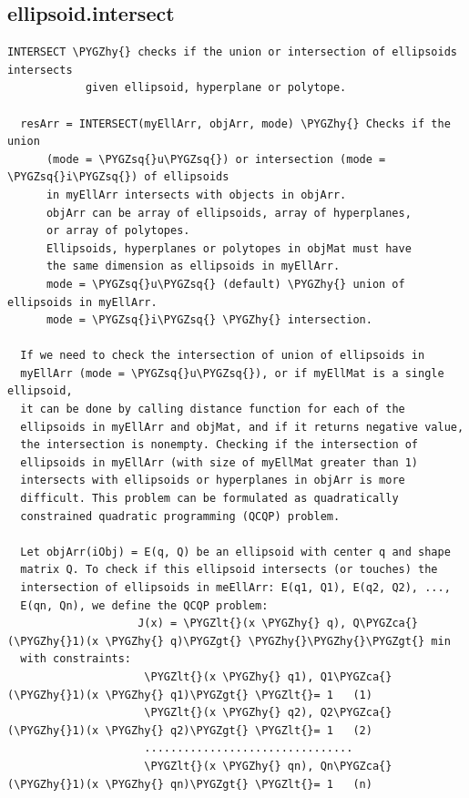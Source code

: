 \documentclass[letterpaper,10pt,english]{sphinxmanual}
\def\PYGZca{\char`\^}
\def\PYGZlt{\char`\<}
\def\PYGZgt{\char`\>}
\def\PYGZhy{\char`\-}
\def\PYGZsq{\char`\'}
\begin{document}
\subsection{ellipsoid.intersect}
\label{chap_functions:ellipsoid-intersect}
\begin{Verbatim}[commandchars=\\\{\}]
INTERSECT \PYGZhy{} checks if the union or intersection of ellipsoids intersects
            given ellipsoid, hyperplane or polytope.

  resArr = INTERSECT(myEllArr, objArr, mode) \PYGZhy{} Checks if the union
      (mode = \PYGZsq{}u\PYGZsq{}) or intersection (mode = \PYGZsq{}i\PYGZsq{}) of ellipsoids
      in myEllArr intersects with objects in objArr.
      objArr can be array of ellipsoids, array of hyperplanes,
      or array of polytopes.
      Ellipsoids, hyperplanes or polytopes in objMat must have
      the same dimension as ellipsoids in myEllArr.
      mode = \PYGZsq{}u\PYGZsq{} (default) \PYGZhy{} union of ellipsoids in myEllArr.
      mode = \PYGZsq{}i\PYGZsq{} \PYGZhy{} intersection.

  If we need to check the intersection of union of ellipsoids in
  myEllArr (mode = \PYGZsq{}u\PYGZsq{}), or if myEllMat is a single ellipsoid,
  it can be done by calling distance function for each of the
  ellipsoids in myEllArr and objMat, and if it returns negative value,
  the intersection is nonempty. Checking if the intersection of
  ellipsoids in myEllArr (with size of myEllMat greater than 1)
  intersects with ellipsoids or hyperplanes in objArr is more
  difficult. This problem can be formulated as quadratically
  constrained quadratic programming (QCQP) problem.

  Let objArr(iObj) = E(q, Q) be an ellipsoid with center q and shape
  matrix Q. To check if this ellipsoid intersects (or touches) the
  intersection of ellipsoids in meEllArr: E(q1, Q1), E(q2, Q2), ...,
  E(qn, Qn), we define the QCQP problem:
                    J(x) = \PYGZlt{}(x \PYGZhy{} q), Q\PYGZca{}(\PYGZhy{}1)(x \PYGZhy{} q)\PYGZgt{} \PYGZhy{}\PYGZhy{}\PYGZgt{} min
  with constraints:
                     \PYGZlt{}(x \PYGZhy{} q1), Q1\PYGZca{}(\PYGZhy{}1)(x \PYGZhy{} q1)\PYGZgt{} \PYGZlt{}= 1   (1)
                     \PYGZlt{}(x \PYGZhy{} q2), Q2\PYGZca{}(\PYGZhy{}1)(x \PYGZhy{} q2)\PYGZgt{} \PYGZlt{}= 1   (2)
                     ................................
                     \PYGZlt{}(x \PYGZhy{} qn), Qn\PYGZca{}(\PYGZhy{}1)(x \PYGZhy{} qn)\PYGZgt{} \PYGZlt{}= 1   (n)


\end{Verbatim}
\end{document}
